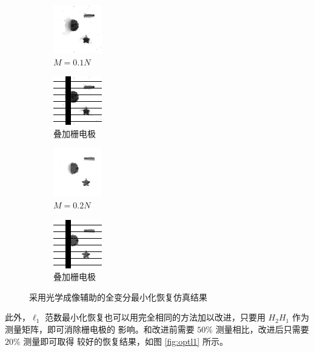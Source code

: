 \begin{figure}
\centering
\begin{subfigure}[h]{1.1in}
\includegraphics{Figure/TV/opt1.png}
\caption{$M = 0.1N$}
\end{subfigure}
\begin{subfigure}[h]{1.1in}
\includegraphics{Figure/TV/opt1f.png}
\caption{叠加栅电极}
\end{subfigure}
\begin{subfigure}[h]{1.1in}
\includegraphics{Figure/TV/opt2.png}
\caption{$M = 0.2N$}
\end{subfigure}
\begin{subfigure}[h]{1.1in}
\includegraphics{Figure/TV/opt2f.png}
\caption{叠加栅电极}
\end{subfigure}
\caption{采用光学成像辅助的全变分最小化恢复仿真结果}
\label{fig:opttv}
\end{figure}

此外，$\ell_1$ 范数最小化恢复也可以用完全相同的方法加以改进，只要用
$H_2 H_1$ 作为测量矩阵，即可消除栅电极的
影响。和改进前需要 $50\%$ 测量相比，改进后只需要 $20\%$ 测量即可取得
较好的恢复结果，如图 \ref{fig:optl1} 所示。

